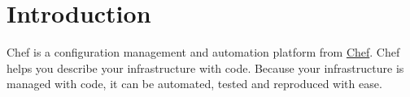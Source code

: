 \chapter{Introduction}

Chef is a configuration management and automation platform from \href{http://www.getchef.com/}{Chef}. Chef helps you describe your infrastructure with code. Because your infrastructure is managed with code, it can be automated, tested and reproduced with ease.
